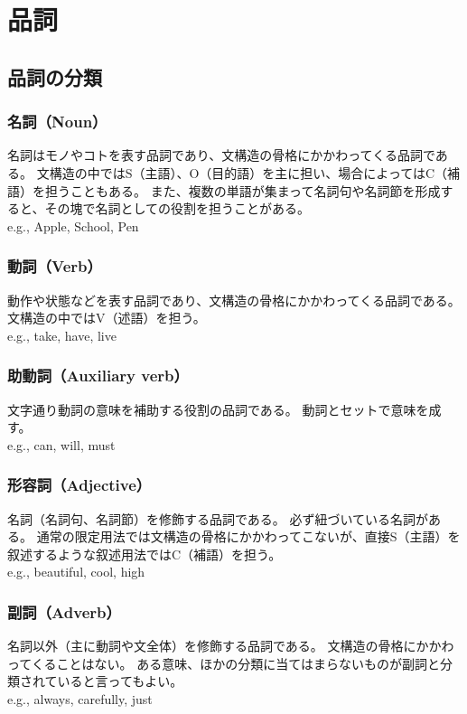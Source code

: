 \documentclass[11pt,a4paper,titlepage]{jsarticle}
\title{}
\author{}
\date{\today}
\begin{document}
\section{品詞}

\subsection{品詞の分類}

\subsubsection{名詞（Noun）}
名詞はモノやコトを表す品詞であり、文構造の骨格にかかわってくる品詞である。
文構造の中ではS（主語）、O（目的語）を主に担い、場合によってはC（補語）を担うこともある。
また、複数の単語が集まって名詞句や名詞節を形成すると、その塊で名詞としての役割を担うことがある。\\
e.g., Apple, School, Pen

\subsubsection{動詞（Verb）}
動作や状態などを表す品詞であり、文構造の骨格にかかわってくる品詞である。
文構造の中ではV（述語）を担う。\\
e.g., take, have, live

\subsubsection{助動詞（Auxiliary verb）}
文字通り動詞の意味を補助する役割の品詞である。
動詞とセットで意味を成す。\\
e.g., can, will, must

\subsubsection{形容詞（Adjective）}
名詞（名詞句、名詞節）を修飾する品詞である。
必ず紐づいている名詞がある。
通常の限定用法では文構造の骨格にかかわってこないが、直接S（主語）を叙述するような叙述用法ではC（補語）を担う。\\
e.g., beautiful, cool, high

\subsubsection{副詞（Adverb）}
名詞以外（主に動詞や文全体）を修飾する品詞である。
文構造の骨格にかかわってくることはない。
ある意味、ほかの分類に当てはまらないものが副詞と分類されていると言ってもよい。\\
e.g., always, carefully, just
\end{document}
